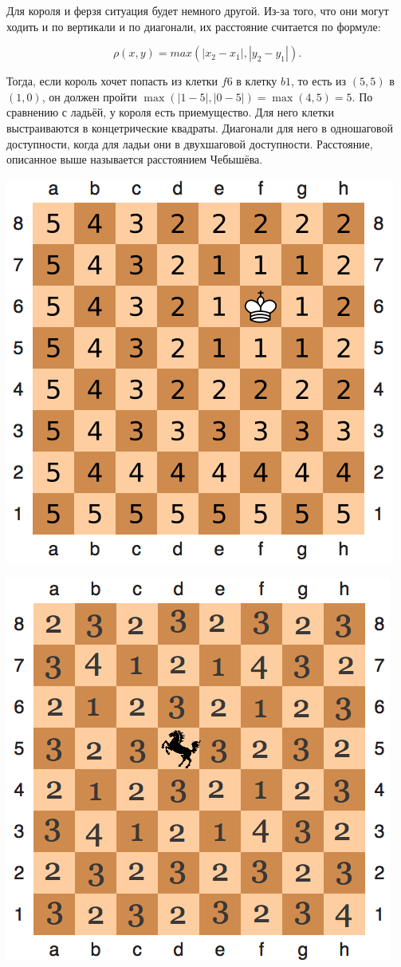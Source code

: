 \documentclass[12pt, a4paper, oneside]{article}
\begin{document}
{Для короля и ферзя ситуация будет немного другой. Из-за того, что они могут ходить и по вертикали и по диагонали, их расстояние считается по формуле:

\[ \rho(x,y) = max( |x_2 - x_1|, |y_2 - y_1| ). \]

Тогда, если король хочет попасть из клетки $f6$ в клетку $b1$, то есть из $(5,5)$ в $(1,0)$, он должен пройти $\max(|1-5|, |0-5|) = \max(4, 5) = 5$. По сравнению с ладьёй, у короля есть приемущество. Для него клетки выстраиваются в концетрические квадраты. Диагонали для него в одношаговой доступности, когда для ладьи они в двухшаговой доступности. Расстояние, описанное выше называется расстоянием Чебышёва. 

\begin{minipage}[t]{0.45\textwidth}
	\includegraphics[scale=0.5]{king.png}
\end{minipage}
\hfill
\begin{minipage}[t]{0.45\textwidth}
	\includegraphics[scale=0.5]{koni.png}

\end{minipage}}
\end{document}
